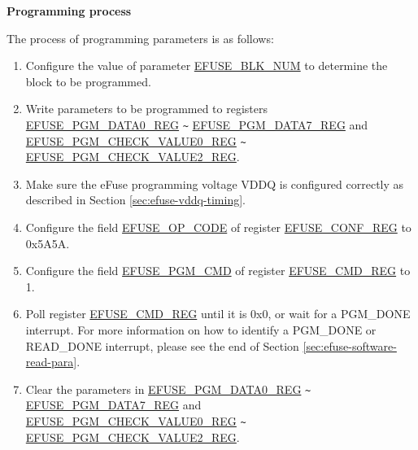 \documentclass[main\_\_EN.tex]{subfiles}
\begin{document}
{\bfseries Programming process}

The process of programming parameters is as follows:

\begin{enumerate}
\item Configure the value of parameter \hyperref[fielddesc:EFUSEBLKNUM]{EFUSE\_BLK\_NUM} to determine the block to be programmed.

\item Write parameters to be programmed to registers \hyperref[regdesc:EFUSEPGMDATA0REG]{EFUSE\_PGM\_DATA0\_REG} \verb+~+ \hyperref[regdesc:EFUSEPGMDATA7REG]{EFUSE\_PGM\_DATA7\_REG} and  \hyperref[regdesc:EFUSEPGMCHECKVALUE0REG]{EFUSE\_PGM\_CHECK\_VALUE0\_REG} \verb+~+ \hyperref[regdesc:EFUSEPGMCHECKVALUE2REG]{EFUSE\_PGM\_CHECK\_VALUE2\_REG}.

\item Make sure the eFuse programming voltage VDDQ is configured correctly as described in Section \ref{sec:efuse-vddq-timing}.

\item Configure the field \hyperref[fielddesc:EFUSEOPCODE]{EFUSE\_OP\_CODE} of register \hyperref[regdesc:EFUSECONFREG]{EFUSE\_CONF\_REG} to 0x5A5A.

\item Configure the field \hyperref[fielddesc:EFUSEPGMCMD]{EFUSE\_PGM\_CMD} of register \hyperref[regdesc:EFUSECMDREG]{EFUSE\_CMD\_REG} to 1.

\item Poll register \hyperref[regdesc:EFUSECMDREG]{EFUSE\_CMD\_REG} until it is 0x0, or wait for a PGM\_DONE interrupt. For more information on how to identify a PGM\_DONE or READ\_DONE interrupt, please see the end of Section \ref{sec:efuse-software-read-para}.

\item Clear the parameters in \hyperref[regdesc:EFUSEPGMDATA0REG]{EFUSE\_PGM\_DATA0\_REG} \verb+~+ \hyperref[regdesc:EFUSEPGMDATA7REG]{EFUSE\_PGM\_DATA7\_REG} and \\ \hyperref[regdesc:EFUSEPGMCHECKVALUE0REG]{EFUSE\_PGM\_CHECK\_VALUE0\_REG} \verb+~+ \hyperref[regdesc:EFUSEPGMCHECKVALUE2REG]{EFUSE\_PGM\_CHECK\_VALUE2\_REG}.


\end{enumerate}
\end{document}
